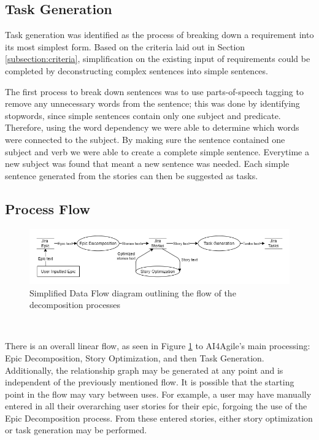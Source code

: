 \subsection{Task Generation}

Task generation was identified as the process of breaking down a requirement into its most simplest form. Based on the criteria laid out in Section \ref{subsection:criteria}, simplification on the existing input of requirements could be completed by deconstructing complex sentences into simple sentences. 

The first process to break down sentences was to use parts-of-speech tagging to remove any unnecessary words from the sentence; this was done by identifying stopwords, since simple sentences contain only one subject and predicate. Therefore, using the word dependency we were able to determine which words were connected to the subject. By making sure the sentence contained one subject and verb we were able to create a complete simple sentence. Everytime a new subject was found that meant a new sentence was needed. Each simple sentence generated from the stories can then be suggested as tasks.

\subsection{Process Flow}

\begin{figure}
\centerline{\includegraphics[width=\textwidth,height=\textheight,keepaspectratio]{./figure/ExampleDataFlowDiagram.png}}
\caption{Simplified Data Flow diagram outlining the flow of the decomposition processes}
\label{fig:ExampleDataFlowDiagram}
\end{figure}\

There is an overall linear flow, as seen in Figure \ref{fig:ExampleDataFlowDiagram} to AI4Agile’s main processing: Epic Decomposition, Story Optimization, and then Task Generation. Additionally, the relationship graph may be generated at any point and is independent of the previously mentioned flow. It is possible that the starting point in the flow may vary between uses. For example, a user may have manually entered in all their overarching user stories for their epic, forgoing the use of the Epic Decomposition process. From these entered stories, either story optimization or task generation may be performed.

